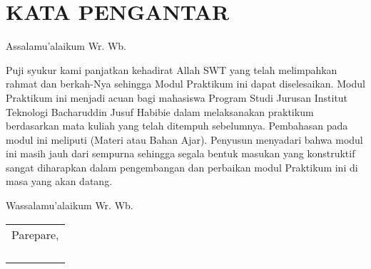 \documentclass[../thesis.tex]{subfiles}
\begin{document}
\chapter*{KATA PENGANTAR}


Assalamu’alaikum Wr. Wb.

Puji syukur kami panjatkan kehadirat Allah SWT yang telah melimpahkan rahmat dan berkah-Nya sehingga Modul Praktikum \Course ini dapat diselesaikan.
Modul Praktikum \Course ini menjadi acuan bagi mahasiswa Program Studi \Prodi Jurusan \Fak Institut Teknologi Bacharuddin Jusuf Habibie dalam melaksanakan praktikum berdasarkan mata kuliah yang telah ditempuh sebelumnya.
Pembahasan pada modul ini meliputi (Materi atau Bahan Ajar).
Penyusun menyadari bahwa modul ini masih jauh dari sempurna sehingga segala bentuk masukan yang konstruktif sangat diharapkan dalam pengembangan dan perbaikan modul Praktikum \Course ini di masa yang akan datang.

Wassalamu’alaikum Wr. Wb.



\vspace{2\baselineskip}
\begin{flushright}
	\begin{tabular}{@{}l}

		Parepare, \DTMtoday  \\
		\\
		\\
		\\
		\yourName  \\
	\end{tabular}
\end{flushright}
\clearpage


\end{document}
